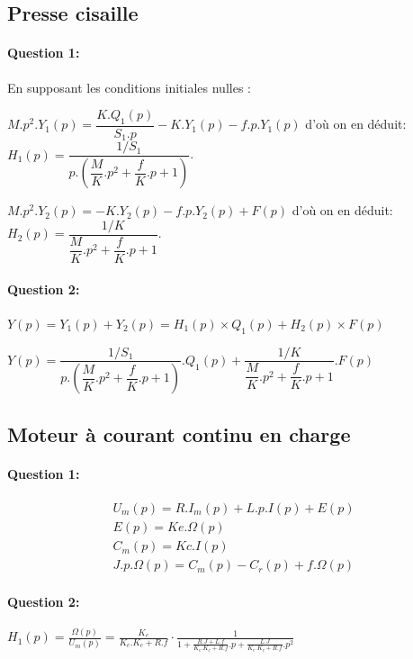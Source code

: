 \subsection{Presse cisaille}

\paragraph{Question 1:}

En supposant les conditions initiales nulles :

$M.p^2.Y_1(p)=\dfrac{K.Q_1(p)}{S_1.p}-K.Y_1(p)-f.p.Y_1(p)$ d'où on en déduit: $H_1(p)=\dfrac{1/S_1}{p.\left(\dfrac{M}{K}.p^2+\dfrac{f}{K}.p+1\right)}$.

$M.p^2.Y_2(p)=-K.Y_2(p)-f.p.Y_2(p)+F(p)$ d'où on en déduit: $H_2(p)=\dfrac{1/K}{\dfrac{M}{K}.p^2+\dfrac{f}{K}.p+1}$.

\paragraph{Question 2:}

$Y(p)=Y_1(p)+Y_2(p)=H_1(p)\times Q_1(p)+H_2(p)\times F(p)$

$Y(p)=\dfrac{1/S_1}{p.\left(\dfrac{M}{K}.p^2+\dfrac{f}{K}.p+1\right)}.Q_1(p)+
\dfrac{1/K}{\dfrac{M}{K}.p^2+\dfrac{f}{K}.p+1}.F(p)$

\subsection{Moteur à courant continu en charge}

\paragraph{Question 1:} 

\begin{eqnarray}
U_m(p)=R.I_m(p)+L.p.I(p)+E(p) \\
E(p)=Ke.\Omega(p) \\
C_m(p)=Kc.I(p) \\
J.p.\Omega(p)=C_m(p)-C_r(p)+f.\Omega(p)
\end{eqnarray}

\paragraph{Question 2:} $H_1(p)=\frac{{\Omega}(p)}{{U}_{m}(p)}=\frac{K_c}{K_e.K_c+R.f} \cdot \frac{1}{1+\frac{R.J+L.f}{K_e.K_c+R.f}.p+\frac{L.J}{K_e.K_c+R.f}.p^2}$


